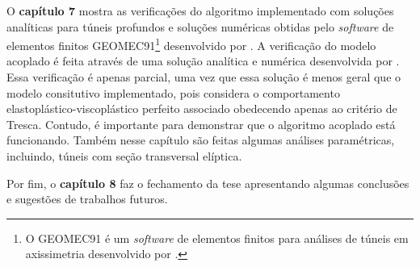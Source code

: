 O \textbf{capítulo 7} mostra as verificações do algoritmo implementado com soluções analíticas para túneis profundos e soluções numéricas obtidas pelo \textit{software} de elementos finitos GEOMEC91\footnote{O GEOMEC91 é um \textit{software} de elementos finitos para análises de túneis em axissimetria desenvolvido por .} desenvolvido por . A verificação do modelo acoplado é feita através de uma solução analítica e numérica desenvolvida por . Essa verificação é apenas parcial, uma vez que essa solução é menos geral que o modelo consitutivo implementado, pois considera o comportamento elastoplástico-viscoplástico perfeito associado obedecendo apenas ao critério de Tresca. Contudo, é importante para demonstrar que o algoritmo acoplado está funcionando. Também nesse capítulo são feitas algumas análises paramétricas, incluindo, túneis com seção transversal elíptica.

Por fim, o \textbf{capítulo 8} faz o fechamento da tese apresentando algumas conclusões e sugestões de trabalhos futuros.


 
